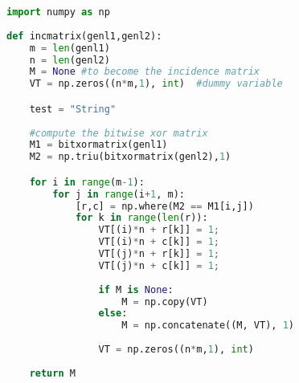 \begin{lstlisting}[language=Python, caption=Code snippet example]
import numpy as np
    
def incmatrix(genl1,genl2):
    m = len(genl1)
    n = len(genl2)
    M = None #to become the incidence matrix
    VT = np.zeros((n*m,1), int)  #dummy variable

    test = "String"
    
    #compute the bitwise xor matrix
    M1 = bitxormatrix(genl1)
    M2 = np.triu(bitxormatrix(genl2),1) 

    for i in range(m-1):
        for j in range(i+1, m):
            [r,c] = np.where(M2 == M1[i,j])
            for k in range(len(r)):
                VT[(i)*n + r[k]] = 1;
                VT[(i)*n + c[k]] = 1;
                VT[(j)*n + r[k]] = 1;
                VT[(j)*n + c[k]] = 1;
                
                if M is None:
                    M = np.copy(VT)
                else:
                    M = np.concatenate((M, VT), 1)
                
                VT = np.zeros((n*m,1), int)
    
    return M
\end{lstlisting}